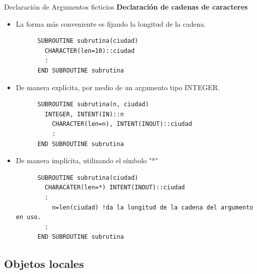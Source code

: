 \begin{frame}[fragile]{Declaración de Argumentos ficticios}
\textbf{Declaración de cadenas de caracteres}
 \begin{itemize}[<+(1)->]
  \item La forma más conveniente es fijando la longitud de la cadena.
      \begin{verbatim}
      SUBROUTINE subrutina(ciudad)
        CHARACTER(len=10)::ciudad
        :
      END SUBROUTINE subrutina
      \end{verbatim}
    \vspace{0.1cm}    
  \item De manera explícita, por medio de un argumento tipo INTEGER.
      \begin{verbatim}
      SUBROUTINE subrutina(n, ciudad)
        INTEGER, INTENT(IN)::n
          CHARACTER(len=n), INTENT(INOUT)::ciudad
          :
      END SUBROUTINE subrutina
      \end{verbatim}
    \vspace{0.1cm} 
  \item De manera implícita, utilizando el símbolo "*"
      \begin{verbatim}
      SUBROUTINE subrutina(ciudad)
        CHARACATER(len=*) INTENT(INOUT)::ciudad
        :
          n=len(ciudad) !da la longitud de la cadena del argumento en uso.
        :
      END SUBROUTINE subrutina
      \end{verbatim} 
 \end{itemize}
\end{frame}


\subsection{Objetos locales}


